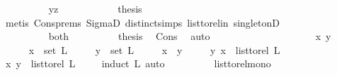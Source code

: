 \begin{isabellebody}
\ \ \ \ \ \ \ \ \isamarkupfalse%
\ yz\isanewline
\ \ \ \ \ \ \ \ \isamarkupfalse%
\ \isamarkupfalse%
\ {\isacharquery}{\kern0pt}thesis\ \ \isanewline
\ \ \ \ \ \ \ \ \ \ \isamarkupfalse%
\ {\isacharparenleft}{\kern0pt}metis\ Cons{\isachardot}{\kern0pt}prems{\isacharparenleft}{\kern0pt}{}{\isacharparenright}{\kern0pt}\ SigmaD{}\ distinct{\isachardot}{\kern0pt}simps{\isacharparenleft}{\kern0pt}{}{\isacharparenright}{\kern0pt}\ list{\isacharunderscore}{\kern0pt}to{\isacharunderscore}{\kern0pt}rel{\isacharunderscore}{\kern0pt}in\ singletonD{\isacharparenright}{\kern0pt}\ \isanewline
\ \ \ \ \ \ \isamarkupfalse%
\isanewline
\ \ \ \ \ \ \ \ \isamarkupfalse%
\ both\isanewline
\ \ \ \ \ \ \isamarkupfalse%
\ \isamarkupfalse%
\ {\isacharquery}{\kern0pt}thesis\ \isamarkupfalse%
\ Cons\ \isamarkupfalse%
\ auto\ \isanewline
\ \ \ \ \ \ \isamarkupfalse%
\isanewline
\ \ \ \ \isamarkupfalse%
\isanewline
\ \ \isamarkupfalse%
\isanewline
\ \ \ \ \isamarkupfalse%
\ x\ y\ \isanewline
\ \ \ \ \isamarkupfalse%
\ {\isachardoublequoteopen}x\ {\isasymin}\ set\ L{\isachardoublequoteclose}\isanewline
\ \ \ \ \ {\isachardoublequoteopen}y\ {\isasymin}\ set\ L{\isachardoublequoteclose}\isanewline
\ \ \ \ \ {\isachardoublequoteopen}x\ {\isasymnoteq}\ y{\isachardoublequoteclose}\isanewline
\ \ \ \ \ {\isachardoublequoteopen}{\isacharparenleft}{\kern0pt}y{\isacharcomma}{\kern0pt}\ x{\isacharparenright}{\kern0pt}\ {\isasymnotin}\ list{\isacharunderscore}{\kern0pt}to{\isacharunderscore}{\kern0pt}rel\ L{\isachardoublequoteclose}\isanewline
\ \ \ \ \isamarkupfalse%
\ \isamarkupfalse%
\ {\isachardoublequoteopen}{\isacharparenleft}{\kern0pt}x{\isacharcomma}{\kern0pt}\ y{\isacharparenright}{\kern0pt}\ {\isasymin}\ list{\isacharunderscore}{\kern0pt}to{\isacharunderscore}{\kern0pt}rel\ L{\isachardoublequoteclose}\isanewline
\ \ \ \ \isamarkupfalse%
{\isacharparenleft}{\kern0pt}induct\ L{\isacharcomma}{\kern0pt}\ auto{\isacharparenright}{\kern0pt}\ \isamarkupfalse%
\ \ \ \ \isanewline
\ \ \isamarkupfalse%
%
\endisatagproof
{\isafoldproof}%
%
\isadelimproof
\isanewline
%
\endisadelimproof
\isanewline
\isanewline
{}\isamarkupfalse%
\ list{\isacharunderscore}{\kern0pt}to{\isacharunderscore}{\kern0pt}rel{\isacharunderscore}{\kern0pt}mono{\isacharcolon}{\kern0pt}\isanewline

\end{isabellebody}
